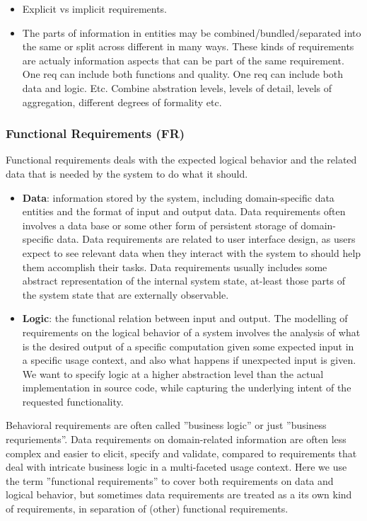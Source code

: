 \begin{itemize}
  \item Explicit vs implicit requirements.
  \item The parts of information in entities may be combined/bundled/separated into the same or split across different in many ways. These kinds of requirements are actualy information aspects that can be part of the same requirement. One req can include both functions and quality. One req can include both data and logic. Etc. Combine abstration levels, levels of detail, levels of aggregation, different degrees of formality etc.
\end{itemize}


\subsubsection{Functional Requirements (FR)}
Functional requirements deals with the expected logical behavior and the related data that is needed by the system to do what it should.
\begin{itemize}
  \item \textbf{Data}: information stored by the system, including domain-specific data entities and the format of input and output data. Data requirements often involves a data base or some other form of persistent storage of domain-specific data. Data requirements are related to user interface design, as users expect to see relevant data when they interact with the system to should help them accomplish their tasks. Data requirements usually includes some abstract representation of the internal system state, at-least those parts of the system state that are externally observable.
  \item \textbf{Logic}: the functional relation between input and output. The modelling of requirements on the logical behavior of a system involves the analysis of what is the desired output of a specific computation given some expected input in a specific usage context, and also what happens if unexpected input is given. We want to specify logic at a higher abstraction level than the actual implementation in source code, while capturing the underlying intent of the requested functionality. 
\end{itemize}

Behavioral requirements are often called ''business logic'' or just ''business requriements''. Data requirements on domain-related information are often less complex and easier to elicit, specify and validate, compared to requirements that deal with intricate business logic in a multi-faceted usage context. Here we use the term ''functional requirements'' to cover both requirements on data and logical behavior, but sometimes data requirements are treated as a its own kind of requirements, in separation of (other) functional requirements. 

